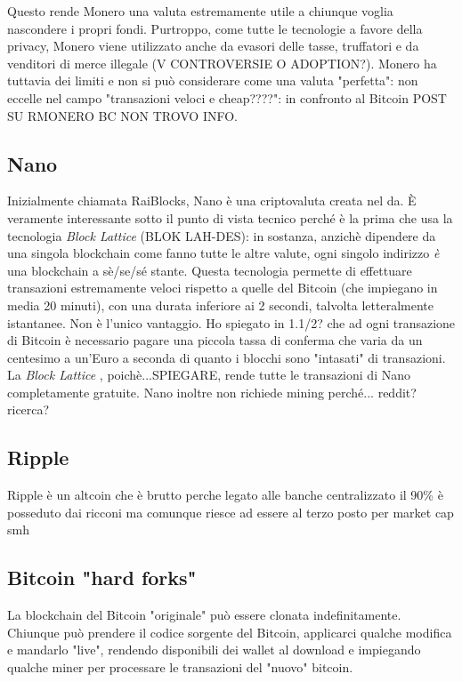 \documentclass {article}
\begin{document}
{Questo rende Monero una valuta estremamente utile a chiunque voglia nascondere i propri fondi.
Purtroppo, come tutte le tecnologie a favore della privacy, Monero viene utilizzato anche da evasori delle tasse, truffatori e da venditori di merce illegale (V CONTROVERSIE O ADOPTION?).
Monero ha tuttavia dei limiti e non si può considerare come una valuta "perfetta": non eccelle nel campo "transazioni veloci e cheap????": in confronto al Bitcoin POST SU RMONERO BC NON TROVO INFO.


\subsection {Nano}


Inizialmente chiamata RaiBlocks, Nano è una criptovaluta creata nel da.
È veramente interessante sotto il punto di vista tecnico perché è la prima che usa la tecnologia \textit{Block Lattice} (BLOK LAH-DES): in sostanza, anzichè dipendere da una singola blockchain come fanno tutte le altre valute, ogni singolo indirizzo \emph{è} una blockchain a sè/se/sé stante.
Questa tecnologia permette di effettuare transazioni estremamente veloci rispetto a quelle del Bitcoin (che impiegano in media 20 minuti), con una durata inferiore ai 2 secondi, talvolta letteralmente istantanee.
Non è l'unico vantaggio. Ho spiegato in 1.1/2? che ad ogni transazione di Bitcoin è necessario pagare una piccola tassa di conferma che varia da un centesimo a un'Euro a seconda di quanto i blocchi sono "intasati" di transazioni.
La \textit{Block Lattice} , poichè...SPIEGARE, rende tutte le transazioni di Nano completamente gratuite.
Nano inoltre non richiede mining perché... reddit? ricerca?


\subsection {Ripple}


Ripple è un altcoin che è brutto perche legato alle banche centralizzato il 90\% è posseduto dai ricconi ma comunque riesce ad essere al terzo posto per market cap smh


\subsection {Bitcoin "hard forks"}


La blockchain del Bitcoin "originale" può essere clonata indefinitamente. Chiunque può prendere il codice sorgente del Bitcoin, applicarci qualche modifica e mandarlo "live", rendendo disponibili dei wallet al download e impiegando qualche miner per processare le transazioni del "nuovo" bitcoin.

}
\end{document}
